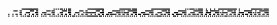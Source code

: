 \documentclass[10pt]{article}
\theoremstyle{plain}
\theoremstyle{definition}
\begin{document}
\begin{table*}[b]
{\begin{minipage}{5.32in}
\[\begin{array}{@{}r@{}}
\begin{array}{@{}l@{}}
\a\a\a\a\a\a\a\a\a\a\a\a\a\a\a\a\b\b\b\b\b\b\b\b\b\b\b\b\b\b\b\b\a\a\a\a \a\a\a\a\a\a\a\a\a\a\a\b\a\b\a\b\a\b\b\b\a\b\a\b\a\b\b\b\a\a\a\a\a\a\a\a \a\a\a\a\a\a\a\a\b\b\b\b\b\b\b\b\b\b\b\b\b\b\b\b\a\a\a\a\a\a\a\a\a\a\a\a \a\a\a\b\b\b\b\b\b\b\b\b\b\b\a\b\b\b\b\b\a\a\a\a\a\a\a\a\a\a\a\a\a\a\b\b \b\b\b\b\b\b\b\b\b\b\b\b\b\b\b\b\a\a\a\a\a\a\a\a\a\a\a\a\a\a\a\b\a\b\a\b \b\b\b\b\a\b\a\b\b\b\b\b\a\a\a\b\a\a\a\b\a\a\a\b\a\a\a\b\b\b\b\b\b\b\b\b \b\b\b\b\b\b\b\b\b\a\a\b\a\a\a\a\a\a\a\a\a\a\a\b\b\b\b\b\b\b\b\b\b\b\a\b \b\b\b\b\mynl
\a\a\a\a\a\a\a\a\b\b\b\b\a\a\b\b\a\a\a\a\a\a\a\a\b\b\b\b\a\a\b\b\a\a\a\a \a\a\a\a\b\b\b\b\a\b\b\b\a\a\a\a\a\a\a\b\b\b\b\b\a\b\b\b\a\a\a\a\a\a\a\a \b\b\b\b\a\a\b\b\a\a\a\a\a\a\a\a\b\b\b\b\a\a\b\b\a\a\a\a\a\a\a\a\b\b\b\b \b\b\b\b\a\b\a\b\a\a\a\b\b\b\b\b\b\b\b\b\a\a\a\a\a\a\a\a\b\b\b\b\b\b\b\b \a\a\a\a\a\a\a\a\b\b\b\b\b\a\b\b\a\a\a\a\a\a\a\a\b\b\b\b\b\b\b\b\a\a\a\a \a\a\a\b\b\b\b\b\b\b\b\b\a\a\a\b\b\a\a\b\b\b\b\b\b\b\b\b\a\a\a\b\a\a\a\a \b\b\b\b\b\a\b\b\a\a\a\b\a\a\a\a\b\b\b\b\b\b\b\b\a\a\a\b\a\a\a\b\b\b\b\b \b\b\b\b\mynl
\a\a\a\a\a\a\a\a\a\a\a\a\a\a\b\b\a\a\a\a\b\b\b\b\a\a\a\a\a\b\b\b\a\a\a\a \b\b\b\b\a\a\a\a\a\b\b\b\a\a\a\a\a\b\b\b\a\a\a\a\a\b\b\b\a\a\a\a\b\b\b\b \a\a\a\a\b\a\b\b\b\b\b\b\b\b\b\b\a\a\a\a\b\b\b\b\a\a\a\a\b\b\b\b\a\a\a\a \b\b\b\b\a\b\a\b\b\b\b\b\a\a\a\a\b\b\b\b\a\a\a\a\b\b\b\b\a\a\a\a\b\b\b\b \a\a\a\a\b\b\b\b\a\a\a\a\b\b\b\b\a\a\a\a\b\b\b\b\a\a\a\a\b\b\b\b\a\a\a\a \b\b\b\b\a\a\a\a\b\b\b\b\a\a\a\b\b\b\b\b\a\a\a\a\b\b\b\b\a\b\a\b\b\b\b\b \a\a\a\a\b\b\b\b\a\a\a\b\b\b\b\b\a\a\a\a\b\b\b\b\a\b\a\b\a\b\b\b\a\a\a\a \b\b\b\b\mynl
\a\a\a\b\a\a\a\b\a\a\b\b\a\a\b\b\a\a\a\b\a\a\a\b\a\a\b\b\a\a\b\b\a\a\a\b \a\a\b\b\a\b\b\b\a\a\b\b\a\a\a\b\a\a\b\b\a\a\b\b\a\a\b\b\a\a\a\b\a\a\a\b \a\a\b\b\a\a\b\b\a\a\a\b\a\a\a\b\a\a\b\b\a\a\b\b\a\a\b\b\b\a\b\b\b\b\b\b \a\a\b\b\a\a\b\b\a\a\b\b\a\a\b\b\a\a\b\b\a\b\b\b\a\a\b\b\b\b\b\b\a\a\b\b \a\a\b\b\a\a\a\b\b\a\b\b\a\a\b\b\a\a\b\b\a\a\b\b\b\b\b\b\a\a\b\b\a\a\b\b \a\a\b\b\b\a\b\b\a\a\b\b\a\a\b\b\a\a\b\b\a\a\b\b\a\a\b\b\a\a\b\b\a\a\a\b \a\a\b\b\a\a\b\b\a\a\b\b\a\a\b\b\a\b\b\b\a\a\b\b\a\a\b\b\a\a\b\b\a\a\b\b \a\a\b\b\mynl
\a\a\a\b\a\a\a\b\a\a\a\b\a\a\a\b\a\b\a\b\a\b\b\b\a\b\a\b\a\b\a\b\a\a\a\b \a\b\a\b\a\a\a\b\a\b\a\b\a\b\a\b\a\b\a\b\a\b\a\b\a\b\a\b\a\b\b\b\a\b\a\b \a\b\a\b\a\b\a\b\b\b\b\b\b\b\b\b\b\b\a\b\b\b\a\b\a\b\a\b\a\b\a\b\a\a\a\b \a\b\a\b\a\b\a\b\a\b\a\b\a\b\a\b\a\b\a\b\a\a\a\b\a\b\a\b\a\a\a\b\a\b\a\b \a\b\a\b\b\b\b\b\a\b\a\b\a\b\a\b\a\a\a\b\b\b\a\b\a\a\a\b\a\b\a\b\a\b\a\b \a\b\a\b\a\b\a\b\a\b\a\b\a\b\a\b\a\b\a\b\a\b\a\b\a\b\a\b\a\b\a\b\a\b\b\b \a\b\a\b\a\b\a\b\a\b\a\b\a\b\a\b\a\a\a\b\a\b\a\b\a\b\a\b\a\b\a\b\a\b\a\b \a\b\a\b

\end{array}
\end{array}\]
\end{minipage}}
\end{table*}
\end{document}
